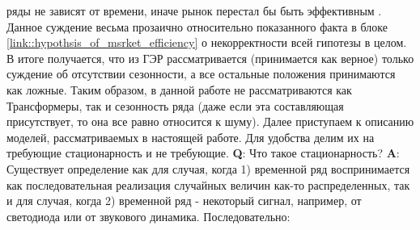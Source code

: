 ряды не зависят от времени, иначе рынок перестал бы быть эффективным \cite{seasonality_test_for_financial_stock_market}. Данное суждение весьма прозаично относительно показанного факта в блоке \ref{link::hypothsis_of_msrket_efficiency} о некорректности всей гипотезы в целом. В итоге получается, что из ГЭР рассматривается (принимается как верное) только суждение об отсутствии сезонности, а все остальные положения принимаются как ложные. Таким образом, в данной работе не рассматриваются как Трансформеры, так и сезонность ряда (даже если эта составляющая присутствует, то она все равно относится к шуму). Далее приступаем к описанию моделей, рассматриваемых в настоящей работе. Для удобства делим их на требующие стационарность и не требующие. \textbf{Q}: Что такое стационарность? \textbf{A}: Существует определение как для случая, когда 1) временной ряд воспринимается как последовательная реализация случайных величин как-то распределенных, так и для случая, когда 2) временной ряд - некоторый сигнал, например, от светодиода или от звукового динамика. Последовательно:
